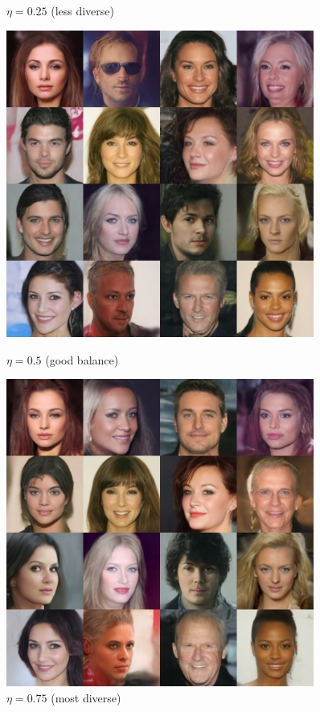 \documentclass[conference]{IEEEtran}
\begin{document}
\begin{figure}[H]
\begin{minipage}{0.25\textwidth}
        \caption{$\eta = 0.25$ (less  diverse)} \label{fig:eta25}
    \end{minipage}\hfill
    \begin{minipage}{0.25\textwidth}
        \centering
        \includegraphics[width=0.9\textwidth]{figures/eta50.png}
        \caption{$\eta = 0.5$ (good balance)} \label{fig:eta50}
    \end{minipage}\hfill
    \begin{minipage}{0.25\textwidth}
        \includegraphics[width=0.9\textwidth]{figures/eta75.png}
        \caption{$\eta = 0.75$ (most diverse)} \label{fig:eta75}
    \end{minipage}
\end{figure} \FloatBarrier
\end{document}
